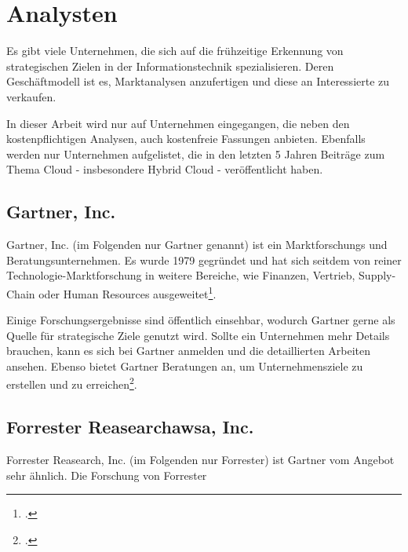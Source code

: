 \newpage
\section{Analysten} \label{analysten}

Es gibt viele Unternehmen, die sich auf die frühzeitige Erkennung von
strategischen Zielen in der Informationstechnik spezialisieren. Deren
Geschäftmodell ist es, Marktanalysen anzufertigen und diese an Interessierte zu
verkaufen.

In dieser Arbeit wird nur auf Unternehmen eingegangen, die neben den
kostenpflichtigen Analysen, auch kostenfreie Fassungen anbieten. Ebenfalls
werden nur Unternehmen aufgelistet, die in den letzten 5 Jahren Beiträge zum
Thema Cloud - insbesondere Hybrid Cloud - veröffentlicht haben.


\subsection{Gartner, Inc.}
Gartner, Inc. (im Folgenden nur Gartner genannt) ist ein Marktforschungs und
Beratungsunternehmen. Es wurde 1979 gegründet und hat sich seitdem von reiner
Technologie-Marktforschung in weitere Bereiche, wie Finanzen, Vertrieb,
Supply-Chain oder Human Resources ausgeweitet\footcite{website:gartner:about}.

Einige Forschungsergebnisse sind öffentlich einsehbar, wodurch Gartner gerne als
Quelle für strategische Ziele genutzt wird. Sollte ein Unternehmen mehr Details
brauchen, kann es sich bei Gartner anmelden und die detaillierten Arbeiten
ansehen. Ebenso bietet Gartner Beratungen an, um Unternehmensziele zu erstellen
und zu erreichen\footcite{website:gartner:about}.

\subsection{Forrester Reasearchawsa, Inc.}
Forrester Reasearch, Inc. (im Folgenden nur Forrester) ist Gartner vom Angebot
sehr ähnlich. Die Forschung von Forrester 
